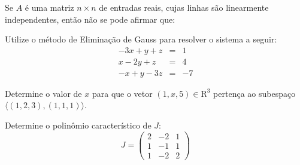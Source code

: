%
{
\def\AMCbeginQuestion#1#2{\par\noindent{\bf (POSCOMP 2004 - Questão 07)}}
\begin{question}{} Se $A$ é uma matriz $n\times n$ de entradas reais, cujas linhas são linearmente independentes, então não se pode afirmar que:
\begin{choices}
\end{choices}
\end{question}
}
%
{
\def\AMCbeginQuestion#1#2{\par\noindent{\bf (POSCOMP 2023 - Questão 01)}}
\begin{question}{} Utilize o método de Eliminação de Gauss para resolver o sistema a seguir:
\[
\begin{array}{rcl}
-3x+y+z&=&1\\
x-2y+z&=&4\\
-x+y-3z&=&-7
\end{array}
\]
\begin{choices}
\end{choices}
\end{question}
}
%
{
\def\AMCbeginQuestion#1#2{\par\noindent{\bf (POSCOMP 2023 - Questão 02)}}
\begin{question}{} Determine o valor de $x$ para que o vetor $(1,x,5)\in\mathrm{R}^{3}$ pertença ao subespaço $\langle(1,2,3),(1,1,1)\rangle$.
\begin{choices}
\end{choices}
\end{question}
}
%
{
\def\AMCbeginQuestion#1#2{\par\noindent{\bf (POSCOMP 2023 - Questão 03)}}
\begin{question}{} Determine o polinômio característico de $J$:
\[
J=\left(\begin{array}{rrr}
2&-2&1\\
1&-1&1\\
1&-2&2
\end{array}\right)
\]
\begin{choices}
\end{choices}
\end{question}
}
